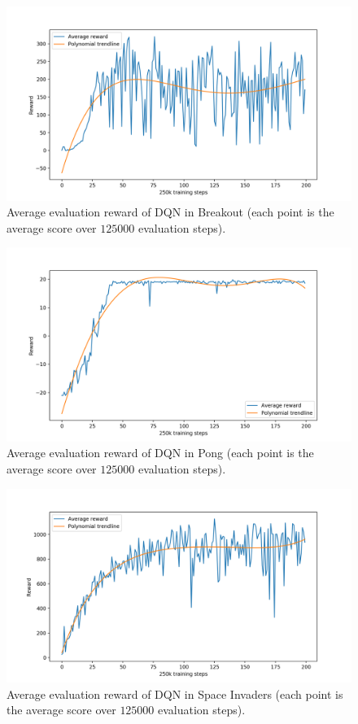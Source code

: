 %
%
\begin{figure}
    \includegraphics[width=\textwidth]{pictures/experiments/baseline_breakout}
    \centering
    \caption[Average performance of DQN in Breakout]{Average evaluation reward 
	    of DQN in Breakout (each point is the average score over $125000$
	    evaluation steps).}
    \label{f:BO_baseline}
\end{figure}
%
%
\begin{figure}
    \includegraphics[width=\textwidth]{pictures/experiments/baseline_pong}
    \centering
    \caption[Average performance of DQN in Pong]{Average evaluation reward 
	    of DQN in Pong (each point is the average score over $125000$
	    evaluation steps).}
    \label{f:P_baseline}
\end{figure}
%
%
\begin{figure}
    \includegraphics[width=\textwidth]{pictures/experiments/baseline_space_invaders}
    \centering
    \caption[Average performance of DQN in Space Invaders]{Average evaluation reward 
	    of DQN in Space Invaders (each point is the average score over $125000$
	    evaluation steps).}
    \label{f:SI_baseline}
\end{figure}
